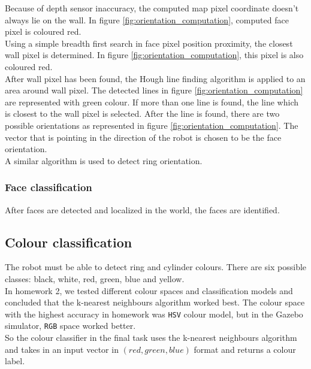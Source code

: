 \documentclass[12pt,a4paper]{article}
\begin{document}
	Because of depth sensor inaccuracy, the computed map pixel coordinate doesn't always lie on the wall. In figure \ref{fig:orientation_computation}, computed face pixel is coloured red. \\
	
	Using a simple breadth first search in face pixel position proximity, the closest wall pixel is determined. In figure \ref{fig:orientation_computation}, this pixel is also coloured red. \\
	
	After wall pixel has been found, the Hough line finding algorithm is applied to an area around wall pixel. The detected lines in figure \ref{fig:orientation_computation} are represented with green colour. If more than one line is found, the line which is closest to the wall pixel is selected. After the line is found, there are two possible orientations as represented in figure \ref{fig:orientation_computation}. The vector that is pointing in the direction of the robot is chosen to be the face orientation. \\
	
	A similar algorithm is used to detect ring orientation.
	
	\subsubsection{Face classification}
	After faces are detected and localized in the world, the faces are identified.
	
	\subsection{Colour classification}
	The robot must be able to detect ring and cylinder colours. There are six possible classes: black, white, red, green, blue and yellow. \\
	
	In homework 2, we tested different colour spaces and classification models and concluded that the k-nearest neighbours algorithm worked best. The colour space with the highest accuracy in homework was \texttt{HSV} colour model, but in the Gazebo simulator, \texttt{RGB} space worked better. \\
	
	So the colour classifier in the final task uses the k-nearest neighbours algorithm and takes in an input vector in $(red, green, blue)$ format and returns a colour label. \\
	
\end{document}
